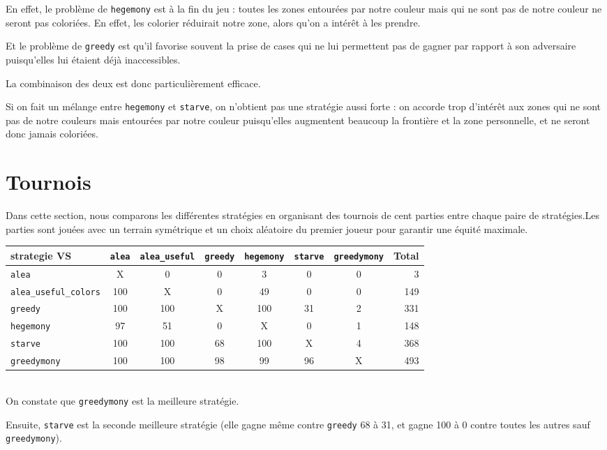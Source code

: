 \documentclass[12pt]{article}
\def\sec#1{\section{#1}}
\begin{document}
En effet, le problème de \texttt{hegemony} est à la fin du jeu : toutes les zones entourées par notre couleur mais qui ne sont pas de notre couleur ne seront pas coloriées. En effet, les colorier réduirait notre zone, alors qu'on a intérêt à les prendre.

Et le problème de \texttt{greedy} est qu'il favorise souvent la prise de cases qui ne lui permettent pas de gagner par rapport à son adversaire puisqu'elles lui étaient déjà inaccessibles.

La combinaison des deux est donc particulièrement efficace.

Si on fait un mélange entre \texttt{hegemony} et \texttt{starve}, on n'obtient pas une stratégie aussi forte : on accorde trop d'intérêt aux zones qui ne sont pas de notre couleurs mais entourées par notre couleur puisqu'elles augmentent beaucoup la frontière et la zone personnelle, et ne seront donc jamais coloriées.

\sec{Tournois}
Dans cette section, nous comparons les différentes stratégies en organisant des tournois de cent parties entre chaque paire de stratégies.Les parties sont jouées avec un terrain symétrique et un choix aléatoire du premier joueur pour garantir une équité maximale.\\


\begin{tabular}{l|c|c|c|c|c|c|r}
strategie VS & \texttt{alea} & \texttt{alea\_useful} & \texttt{greedy} & \texttt{hegemony} & \texttt{starve} & \texttt{greedymony} & Total\\
\hline
\texttt{alea} & X & 0 & 0 & 3 & 0 & 0 & 3\\
\hline
\texttt{alea\_useful\_colors} & 100 & X & 0 & 49 & 0 & 0 & 149\\
\hline
\texttt{greedy} & 100 & 100 & X & 100 & 31 & 2 & 331\\
\hline
\texttt{hegemony} & 97 & 51 & 0 & X & 0 & 1 & 148\\
\hline
\texttt{starve} & 100 & 100 & 68 & 100 & X & 4 & 368\\
\hline
\texttt{greedymony} & 100 & 100 & 98 & 99 & 96 & X & 493\\
\hline
\end{tabular}\\

On constate que \texttt{greedymony} est la meilleure stratégie.

Ensuite, \texttt{starve} est la seconde meilleure stratégie (elle gagne même contre \texttt{greedy} 68 à 31, et gagne 100 à 0 contre toutes les autres sauf \texttt{greedymony}).
\end{document}
